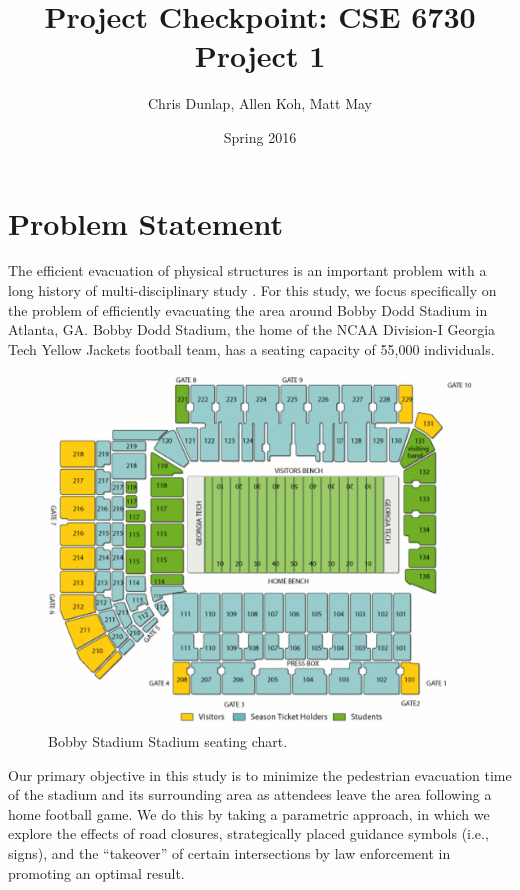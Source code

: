 \documentclass[12pt]{article}
\title{Project Checkpoint: CSE 6730 Project 1}
\author{Chris Dunlap, Allen Koh, Matt May}
\date{Spring 2016}
\begin{document}
\begin{titlepage}
  \maketitle
  \thispagestyle{empty}
\end{titlepage}

\newpage
  \tableofcontents
  \thispagestyle{empty}
\newpage

\section{Problem Statement}
\label{sec:problem}

The efficient evacuation of physical structures is an important problem with a
long history of multi-disciplinary study \cite{zheng2009modeling}. For this
study, we focus specifically on the problem of efficiently evacuating the
area around Bobby Dodd Stadium in Atlanta, GA. Bobby Dodd Stadium, the home of
the NCAA Division-I Georgia Tech Yellow Jackets football team, has a
seating capacity of 55,000 individuals.

\begin{figure}[H]
  \includegraphics[width=\linewidth,natwidth=521,natheight=435]{stadium_diagram_updated.png}
  \caption{Bobby Stadium Stadium seating chart.}
  \label{fig:polygon}
\end{figure}

Our primary objective in this study is to minimize the pedestrian evacuation
time of the stadium and its surrounding area as attendees leave the area
following a home football game. We do this by taking a parametric approach, in
which we explore the effects of road closures, strategically placed guidance
symbols (i.e., signs), and the ``takeover'' of certain intersections by law
enforcement in promoting an optimal result.
\end{document}
